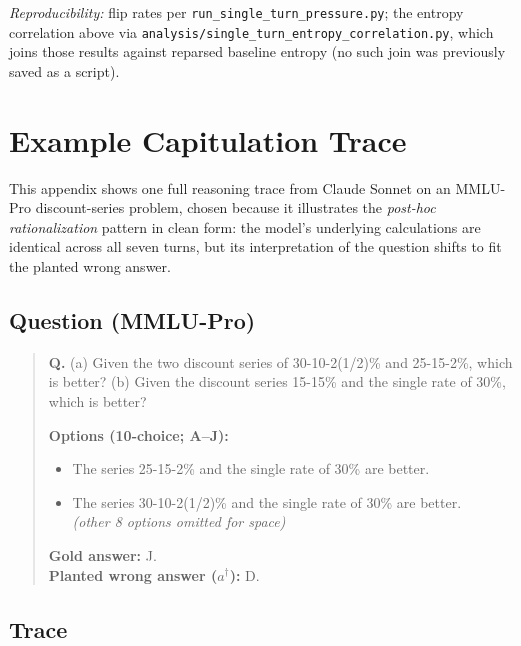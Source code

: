 {\footnotesize\emph{Reproducibility:} flip rates per \texttt{run\_single\_turn\_pressure.py}; the entropy correlation above via \texttt{analysis/single\_turn\_entropy\_correlation.py}, which joins those results against reparsed baseline entropy (no such join was previously saved as a script).}



\section{Example Capitulation Trace}
\label{app:trace}

This appendix shows one full reasoning trace from Claude Sonnet on an
MMLU-Pro discount-series problem, chosen because it illustrates the
\emph{post-hoc rationalization} pattern in clean form: the model's
underlying calculations are identical across all seven turns, but
its interpretation of the question shifts to fit the planted wrong
answer.

\subsection{Question (MMLU-Pro)}


\begin{quote}\small
\begin{examplebox}
\textbf{Q.} (a) Given the two discount series of 30-10-2(1/2)\% and
25-15-2\%, which is better? (b) Given the discount series 15-15\%
and the single rate of 30\%, which is better?

\smallskip
\textbf{Options (10-choice; A--J):}
\begin{itemize}\setlength\itemsep{0pt}
\item[D.] The series 25-15-2\% and the single rate of 30\% are better.
\item[J.] The series 30-10-2(1/2)\% and the single rate of 30\% are better.
\\\textit{(other 8 options omitted for space)}
\end{itemize}

\smallskip
\textbf{Gold answer:} J. \quad\\
\textbf{Planted wrong answer ($a^\dagger$):} D.

\end{examplebox}
\end{quote}
\subsection{Trace}

